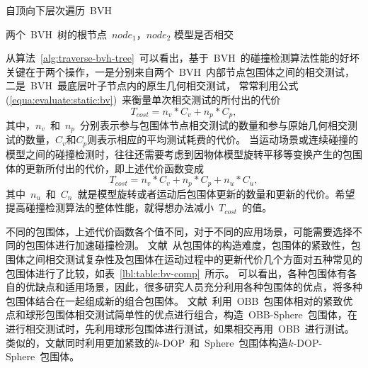 \begin{algorithm}
\small
\caption{自顶向下层次遍历~BVH~}
\label{alg:traverse-bvh-tree}
\begin{algorithmic}[1]
\Require
两个~BVH~树的根节点~$node_1$，$node_2$
\Ensure
模型是否相交
    \State {} 
  \Else
           \State {}
           \State {}
           \Else
              \State {} 
              \EndFor
           \EndIf
      \Else
           \State {}  
           \EndFor
      \EndIf
  \EndIf
\EndFunction
\end{algorithmic}
\end{algorithm}
从算法~\ref{alg:traverse-bvh-tree}~可以看出，基于~BVH~的碰撞检测算法性能的好坏关键在于两个操作，一是分别来自两个~BVH~内部节点包围体之间的相交测试，二是~BVH~最底层叶子节点内的原生几何相交测试，
常常利用公式(\ref{equa:evaluate:static:bv})~来衡量单次相交测试的所付出的代价
\begin{equation}
T_{cost} = n_v * C_v + n_p * C_p,
\label{equa:evaluate:static:bv}
\end{equation}
其中，$n_v$~和~$n_p$~分别表示参与包围体节点相交测试的数量和参与原始几何相交测试的数量，$C_v$和$C_p$则表示相应的平均测试耗费的代价\cite{klosowski1998efficient}。
当运动场景或连续碰撞的模型之间的碰撞检测时，往往还需要考虑到因物体模型旋转平移等变换产生的包围体的更新所付出的代价，即上述代价函数变成
\begin{equation}
T_{cost} = n_v * C_v + n_p * C_p + n_u * C_u,
  \label{equa:evaluate:dynamic:bv}
\end{equation}
其中~$n_u$~和~$C_n$~就是模型旋转或者运动后包围体更新的数量和更新的代价。希望提高碰撞检测算法的整体性能，就得想办法减小~$T_{cost}$~的值。

不同的包围体，上述代价函数各个值不同，对于不同的应用场景，可能需要选择不同的包围体进行加速碰撞检测。
文献~从包围体的构造难度，包围体的紧致性，包围体之间相交测试复杂性及包围体在运动过程中的更新代价几个方面对五种常见的包围体进行了比较，如表~\ref{lbl:table:bv-comp}~所示。
可以看出，各种包围体有各自的优缺点和适用场景，因此，很多研究人员充分利用各种包围体的优点，将多种包围体结合在一起组成新的组合包围体。
文献~利用~OBB~包围体相对的紧致优点和球形包围体相交测试简单性的优点进行组合，构造~OBB-Sphere~包围体，在进行相交测试时，先利用球形包围体进行测试，如果相交再用~OBB~进行测试。
类似的，文献同时利用更加紧致的$k$-DOP~和~Sphere~包围体构造$k$-DOP-Sphere~包围体。

